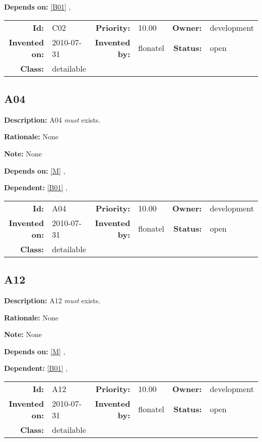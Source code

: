\textbf{Depends on:} \ref{B01} , 

\par
{\small \begin{center}\begin{tabular}{rlrlrl}
\textbf{Id:} & C02 & \textbf{Priority:} & 10.00 & \textbf{Owner:} & development \\ 
\textbf{Invented on:} & 2010-07-31 & \textbf{Invented by:} & flonatel & \textbf{Status:} & open \\ 
\textbf{Class:} & detailable & & & & \\ 
\end{tabular}\end{center} }%
\subsection{A04}\label{A04}
\textbf{Description:} A04 \textsl{must} exists.

\textbf{Rationale:} None

\textbf{Note:} None

\textbf{Depends on:} \ref{M} , 

\textbf{Dependent:} \ref{B01} , 

\par
{\small \begin{center}\begin{tabular}{rlrlrl}
\textbf{Id:} & A04 & \textbf{Priority:} & 10.00 & \textbf{Owner:} & development \\ 
\textbf{Invented on:} & 2010-07-31 & \textbf{Invented by:} & flonatel & \textbf{Status:} & open \\ 
\textbf{Class:} & detailable & & & & \\ 
\end{tabular}\end{center} }%
\subsection{A12}\label{A12}
\textbf{Description:} A12 \textsl{must} exists.

\textbf{Rationale:} None

\textbf{Note:} None

\textbf{Depends on:} \ref{M} , 

\textbf{Dependent:} \ref{B01} , 

\par
{\small \begin{center}\begin{tabular}{rlrlrl}
\textbf{Id:} & A12 & \textbf{Priority:} & 10.00 & \textbf{Owner:} & development \\ 
\textbf{Invented on:} & 2010-07-31 & \textbf{Invented by:} & flonatel & \textbf{Status:} & open \\ 
\textbf{Class:} & detailable & & & & \\ 
\end{tabular}\end{center} }%
